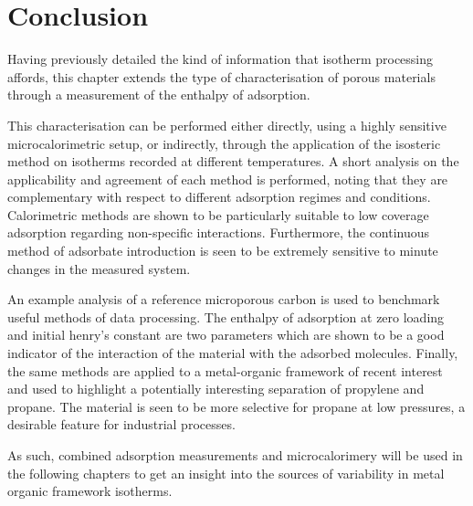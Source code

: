 
\section{Conclusion}

Having previously detailed the kind of information that isotherm
processing affords, this chapter extends the type of characterisation
of porous materials through a measurement of the enthalpy of 
adsorption.

This characterisation can be performed either 
directly, using a highly sensitive microcalorimetric setup, or 
indirectly, through the application of the isosteric method on
isotherms recorded at different temperatures. A short analysis
on the applicability and agreement of each method is performed,
noting that they are complementary with respect to different
adsorption regimes and conditions. Calorimetric methods
are shown to be particularly suitable to low coverage adsorption 
regarding non-specific interactions. Furthermore, the continuous method
of adsorbate introduction is seen to be extremely sensitive
to minute changes in the measured system.

An example analysis of a reference microporous carbon is
used to benchmark useful methods of data processing. The 
enthalpy of adsorption at zero loading and initial henry's 
constant are two parameters which are shown to be a good 
indicator of the interaction of the material with the 
adsorbed molecules.
Finally, the same methods are applied to a metal-organic
framework of recent interest and used to highlight 
a potentially interesting separation of propylene and 
propane. The material is seen to be more selective for 
propane at low pressures, a desirable feature for 
industrial processes.

As such, combined adsorption measurements and microcalorimery
will be used in the following chapters to get an insight into
the sources of variability in metal organic framework isotherms.

\FloatBarrier{}
\pagebreak